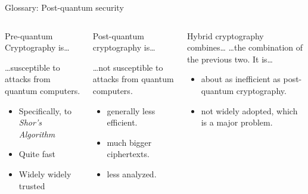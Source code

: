 \begin{frame}{Glossary: Post-quantum security}
\hypertarget{pqc-glossary}{}
\vspace{-\ht\strutbox}
  \begin{columns}[t]
    \begin{column}{.30\linewidth}
      \begin{block}{Pre-quantum Cryptography is… \strut}

      …susceptible to attacks from quantum computers.

      \vspace{0.5em}
      \begin{itemize}
        \item Specifically, to \emph{Shor's Algorithm} %
        \item Quite fast
        \item Widely widely trusted
      \end{itemize}
      \end{block}
    \end{column}

    \begin{column}{.33\linewidth}
      \begin{block}{Post-quantum cryptography is…}

        …not susceptible to attacks from quantum computers.

      \vspace{0.5em}
      \begin{itemize}
        \item generally less efficient.
        \item much bigger ciphertexts.
        \item less analyzed.
      \end{itemize}
      \end{block}
    \end{column}

    \begin{column}{.36\linewidth}
      \begin{block}{Hybrid cryptography combines…}
        …the combination of the previous two. It is…


        \vspace{0.3em}
        \begin{itemize}
          \item about as inefficient as post-quantum cryptography.
          \item not widely adopted, which is a major problem.
        \end{itemize}
      \end{block}
    \end{column}
  \end{columns}
\end{frame}





